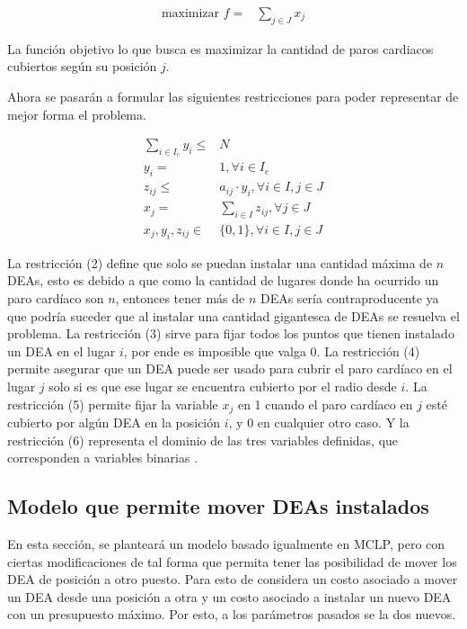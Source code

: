 \documentclass[letter, 10pt]{article}
\begin{document}
\begin{align}
    \text{maximizar } f =& \sum_{j \in J} x_j
\end{align}

La funci\'on objetivo lo que busca es maximizar la cantidad de paros cardiacos cubiertos seg\'un su posici\'on $j$. 

Ahora se pasar\'an a formular las siguientes restricciones para poder representar de mejor forma el problema.

\begin{align}
    \sum_{i \in I_{c}} y_{i} \leq & N\\
    y_{i} =& 1, \forall i \in I_{e}\\
    z_{ij} \leq& a_{ij} \cdot y_{i}, \forall i \in I, j \in J\\
    x_{j} =& \sum_{i \in I} z_{ij}, \forall j \in J\\
    x_{j}, y_{i}, z_{ij} \in& \{0,1\}, \forall i \in I, j \in J
\end{align}

La restricci\'on (2) define que solo se puedan instalar una cantidad m\'axima de $n$ DEAs, esto es debido a que como la cantidad de lugares donde ha ocurrido un paro card\'iaco son $n$, entonces tener m\'as de $n$ DEAs ser\'ia contraproducente ya que podr\'ia suceder que al instalar una cantidad gigantesca de DEAs se resuelva el problema. La restricci\'on (3) sirve para fijar todos los puntos que tienen instalado un DEA en el lugar $i$, por ende es imposible que valga 0. La restricci\'on (4) permite asegurar que un DEA puede ser usado para cubrir el paro card\'iaco en el lugar $j$ solo si es que ese lugar se encuentra cubierto por el radio desde $i$. La restricci\'on (5) permite fijar la variable $x_j$ en 1 cuando el paro card\'iaco en $j$ est\'e cubierto por alg\'un DEA en la posici\'on $i$, y 0 en cualquier otro caso. Y la  restricci\'on (6) representa el dominio de las tres variables definidas, que corresponden a variables binarias \cite{ChanDemir} \cite{Church}.

\subsection{Modelo que permite mover DEAs instalados}

En esta secci\'on, se plantear\'a un modelo basado igualmente en MCLP, pero con ciertas modificaciones de tal forma que permita tener las posibilidad de mover los DEA de posici\'on a otro puesto. Para esto de considera un costo asociado a mover un DEA desde una posici\'on a otra y un costo asociado a instalar un nuevo DEA  con un presupuesto m\'aximo. Por esto, a los par\'ametros pasados se la dos nuevos.
\end{document}

